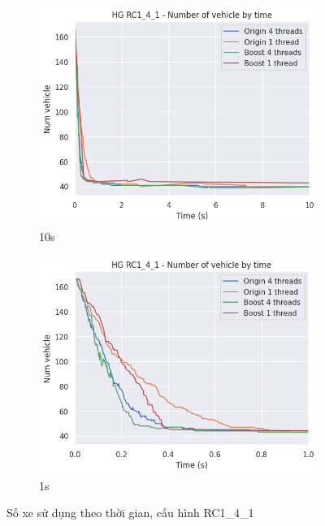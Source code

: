 \begin{figure}[H] %
  \label{fig:perf_ct_rc1}
  \begin{subfigure}{.5\textwidth}
    \centering
    \includegraphics[width=1\linewidth]{figures/nv_time_10s_RC1_4_1.png}
    \caption{10s}
    \label{fig:perf_ct_rc1_4_10s}
  \end{subfigure}%
  \begin{subfigure}{.5\textwidth}
    \centering
    \includegraphics[width=1\linewidth]{figures/nv_time_1s_RC1_4_1.png}
    \caption{1s}
    \label{fig:perf_ct_rc1_4_1s}
  \end{subfigure}
  \caption{Số xe sử dụng theo thời gian, cấu hình RC1\_4\_1}
\end{figure}